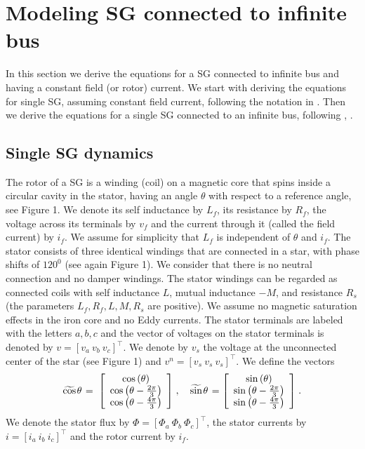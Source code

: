 \documentclass[conference]{IEEEtran}
\newcommand{\m}      {{\hbox{\hskip 1pt}}}
\begin{document}
\section{Modeling SG connected to infinite bus}

In this section we derive the equations for a SG connected to infinite
bus and having a constant field (or rotor) current. We start with
deriving the equations for single SG, assuming constant field current,
following the notation in \cite{ZhWe:11}. Then we derive the equations
for a single SG connected to an infinite bus, following
\cite{NaWe:14}, \cite{NaWe:15}.

\subsection{Single SG dynamics}

The rotor of a SG is a winding (coil) on a magnetic core that spins
inside a circular cavity in the stator, having an angle $\theta$ with
respect to a reference angle, see Figure 1. We denote its self
inductance by $L_f$, its resistance by $R_f$, the voltage across its
terminals by $v_f$ and the current through it (called the field
current) by $i_f$. We assume for simplicity that $L_f$ is independent
of $\theta$ and $i_f$. The stator consists of three identical windings
that are connected in a star, with phase shifts of $120^0$ (see again
Figure 1). We consider that there is no neutral connection and no
damper windings. The stator windings can be regarded as connected
coils with self inductance $L$, mutual inductance $-M$, and resistance
$R_s$ (the parameters $L_f,R_f,L,M,R_s$ are positive). We assume no
magnetic saturation effects in the iron core and no Eddy currents. The
stator terminals are labeled with the letters $a,b,c$ and the vector
of voltages on the stator terminals is denoted by $v=\left[v_a\ v_b\
v_c\right]^\top$. We denote by $v_s$ the voltage at the unconnected 
center of the star (see Figure 1) and $v^n=[v_s\ v_s\ v_s]^\top$.
We define the vectors
$$ \widetilde{\cos}\m\theta \m=\m \left[\begin{array}{c} \cos\left(
   \theta\right)\\ \cos\left(\theta-\frac{2\pi}{3}\right)\\
   \cos\left(\theta-\frac{4\pi}{3}\right) \end{array}\right] \m,\quad
   \widetilde{\sin}\m\theta \m= \left[\begin{array}{c} \sin\left(
   \theta\right)\\ \sin\left(\theta-\frac{2\pi}{3}\right)\\ \sin\left
   (\theta-\frac{4\pi}{3}\right) \end{array}\right] \m.$$
We denote the stator flux by $\Phi=\left[\Phi_a\ \Phi_b\ \Phi_c
\right]^\top$, the stator currents by $i=\left[i_a\ i_b\ i_c\right]
^\top$ and the rotor current by $i_f$. 
\end{document}
